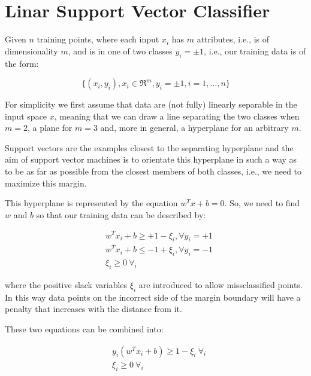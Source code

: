 \section{Linar Support Vector Classifier}

Given $n$ training points, where each input $x_i$ has $m$ attributes, i.e., is of dimensionality $m$, and is in one of two classes $y_i=\pm1$, i.e., our training data is of the form:

\begin{equation}
	\{(x_i,y_i), x_i\in\Re^{m}, y_i=\pm1, i=1, \dots, n\} \label{eq:svc_data}
\end{equation}

For simplicity we first assume that data are (not fully) linearly separable in the input space $x$, meaning that we can draw a line separating the two classes when $m=2$, a plane for $m=3$ and, more in general, a hyperplane for an arbitrary $m$.

Support vectors are the examples closest to the separating hyperplane and the aim of support vector machines is to orientate this hyperplane in such a way as to be as far as possible from the closest members of both classes, i.e., we need to maximize this margin.

This hyperplane is represented by the equation $w^T x + b=0$. So, we need to find $w$ and $b$ so that our training data can be described by:

\begin{equation} \label{eq:svc_consts}
	\begin{aligned}
		& w^T x_i + b \geq +1 - \xi_i, \forall y_i=+1 \\
    	& w^T x_i + b \leq -1 + \xi_i, \forall y_i=-1 \\
    	& \xi_i \geq 0 \ \forall_i
	\end{aligned}
\end{equation}

where the positive slack variables $\xi_i$ are introduced to allow missclassified points. In this way data points on the incorrect side of the margin boundary will have a penalty that increases with the distance from it.

These two equations can be combined into:

\begin{equation} \label{eq:svc_const}
	\begin{aligned}
    	& y_i (w^T x_i + b) \geq 1 - \xi_i \ \forall_i \\
    	& \xi_i\geq 0 \ \forall_i
    \end{aligned}
\end{equation}

